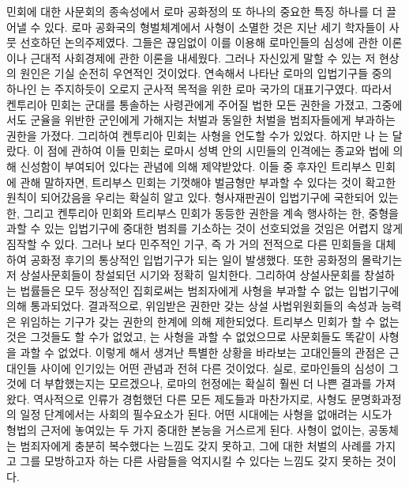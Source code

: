 민회에 대한 사문회의 종속성에서
로마 공화정의 또 하나의 중요한 특징 하나를 더
끌어낼 수 있다.
로마 공화국의 형벌체계에서 사형이 소멸한 것은
지난 세기 학자들이 사뭇 선호하던 논의주제였다.
그들은 끊임없이 이를 이용해
로마인들의 심성에 관한 이론이나
근대적 사회경제에 관한 이론을 내세웠다.
그러나 자신있게 말할 수 있는 저 현상의 원인은
기실 순전히 우연적인 것이었다.
연속해서 나타난 로마의 입법기구들 중의 하나인
는 주지하듯이
오로지 군사적 목적을 위한 로마 국가의 대표기구였다.
따라서 켄투리아 민회는
군대를 통솔하는 사령관에게 주어질 법한 모든 권한을 가졌고,
그중에서도
군율을 위반한 군인에게 가해지는 처벌과 동일한 처벌을 범죄자들에게
부과하는 권한을 가졌다.
그리하여 켄투리아 민회는 사형을 언도할 수가 있었다.
하지만 나
는 달랐다.
이 점에 관하여 이들 민회는
로마시 성벽 안의 시민들의 인격에는
종교와 법에 의해
신성함이 부여되어 있다는 관념에 의해 제약받았다.
이들 중 후자인 트리부스 민회에 관해 말하자면,
트리부스 민회는 기껏해야 벌금형만 부과할 수 있다는 것이
확고한 원칙이 되어갔음을 우리는 확실히 알고 있다.
형사재판권이 입법기구에 국한되어 있는 한,
그리고 켄투리아 민회와 트리부스 민회가
동등한 권한을 계속 행사하는 한,
중형을 과할 수 있는 입법기구에
중대한 범죄를
기소하는 것이
선호되었을 것임은 어렵지 않게 짐작할 수 있다.
그러나
보다 민주적인 기구, 즉 가
거의 전적으로 다른 민회들을 대체하여
공화정 후기의 통상적인 입법기구가 되는 일이 발생했다.
또한
공화정의 몰락기는
저 상설사문회들이 창설되던 시기와 정확히 일치한다.
그리하여
상설사문회를 창설하는 법률들은 모두
정상적인 집회로써는
범죄자에게 사형을 부과할 수 없는 입법기구에 의해 통과되었다.
결과적으로,
위임받은 권한만 갖는
상설 사법위원회들의
속성과 능력은
위임하는 기구가 갖는 권한의 한계에 의해 제한되었다.
트리부스 민회가 할 수 없는 것은
그것들도 할 수가 없었고,
는 사형을 과할 수 없었으므로
사문회들도 똑같이 사형을 과할 수 없었다.
이렇게 해서 생겨난 특별한 상황을 바라보는
고대인들의 관점은
근대인들 사이에 인기있는 어떤 관념과 전혀 다른 것이었다.
실로,
로마인들의 심성이 그것에 더 부합했는지는 모르겠으나,
로마의 헌정에는 확실히 훨씬 더 나쁜 결과를 가져왔다.
역사적으로 인류가 경험했던 다른 모든 제도들과 마찬가지로,
사형도 문명화과정의 일정 단계에서는 사회의 필수요소가 된다.
어떤 시대에는
사형을 없애려는 시도가
형법의 근저에 놓여있는 두 가지 중대한 본능을 거스르게 된다.
사형이 없이는,
공동체는 범죄자에게 충분히 복수했다는 느낌도 갖지 못하고,
그에 대한 처벌의 사례를 가지고
그를 모방하고자 하는 다른 사람들을 억지시킬 수 있다는 느낌도
갖지 못하는 것이다.
